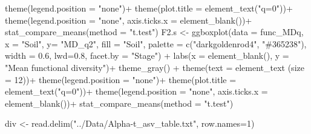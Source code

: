 \documentclass[]{interact}
\theoremstyle{plain}%
\theoremstyle{definition}
\theoremstyle{remark}
\newenvironment{Shaded}{\begin{snugshade}}{\end{snugshade}}
\newcommand{\AttributeTok}[1]{\textcolor[rgb]{0.77,0.63,0.00}{#1}}
\newcommand{\DecValTok}[1]{\textcolor[rgb]{0.00,0.00,0.81}{#1}}
\newcommand{\FloatTok}[1]{\textcolor[rgb]{0.00,0.00,0.81}{#1}}
\newcommand{\FunctionTok}[1]{\textcolor[rgb]{0.00,0.00,0.00}{#1}}
\newcommand{\NormalTok}[1]{#1}
\newcommand{\OtherTok}[1]{\textcolor[rgb]{0.56,0.35,0.01}{#1}}
\newcommand{\SpecialCharTok}[1]{\textcolor[rgb]{0.00,0.00,0.00}{#1}}
\newcommand{\StringTok}[1]{\textcolor[rgb]{0.31,0.60,0.02}{#1}}
\begin{document}
\begin{Shaded}
\begin{Highlighting}[]
  \FunctionTok{theme}\NormalTok{(}\AttributeTok{legend.position =} \StringTok{"none"}\NormalTok{)}\SpecialCharTok{+}
  \FunctionTok{theme}\NormalTok{(}\AttributeTok{plot.title =} \FunctionTok{element\_text}\NormalTok{(}\StringTok{"q=0"}\NormalTok{))}\SpecialCharTok{+}
  \FunctionTok{theme}\NormalTok{(}\AttributeTok{legend.position =} \StringTok{"none"}\NormalTok{,}
        \AttributeTok{axis.ticks.x =} \FunctionTok{element\_blank}\NormalTok{())}\SpecialCharTok{+}
  \FunctionTok{stat\_compare\_means}\NormalTok{(}\AttributeTok{method =} \StringTok{"t.test"}\NormalTok{)}
\NormalTok{F2.s }\OtherTok{\textless{}{-}} \FunctionTok{ggboxplot}\NormalTok{(}\AttributeTok{data =}\NormalTok{ func\_MDq, }\AttributeTok{x =} \StringTok{"Soil"}\NormalTok{, }\AttributeTok{y=} \StringTok{"MD\_q2"}\NormalTok{,}
                  \AttributeTok{fill =} \StringTok{"Soil"}\NormalTok{, }\AttributeTok{palette =} \FunctionTok{c}\NormalTok{(}\StringTok{"darkgoldenrod4"}\NormalTok{, }\StringTok{"\#365238"}\NormalTok{), }
                  \AttributeTok{width =} \FloatTok{0.6}\NormalTok{, }\AttributeTok{lwd=}\FloatTok{0.8}\NormalTok{, }\AttributeTok{facet.by =} \StringTok{"Stage"}\NormalTok{)  }\SpecialCharTok{+}
  \FunctionTok{labs}\NormalTok{(}\AttributeTok{x =} \FunctionTok{element\_blank}\NormalTok{(), }\AttributeTok{y =} \StringTok{"Mean functional diversity"}\NormalTok{)}\SpecialCharTok{+}
  \FunctionTok{theme\_gray}\NormalTok{() }\SpecialCharTok{+}
  \FunctionTok{theme}\NormalTok{(}\AttributeTok{text =} \FunctionTok{element\_text}\NormalTok{ (}\AttributeTok{size =} \DecValTok{12}\NormalTok{))}\SpecialCharTok{+}
  \FunctionTok{theme}\NormalTok{(}\AttributeTok{legend.position =} \StringTok{"none"}\NormalTok{)}\SpecialCharTok{+}
  \FunctionTok{theme}\NormalTok{(}\AttributeTok{plot.title =} \FunctionTok{element\_text}\NormalTok{(}\StringTok{"q=0"}\NormalTok{))}\SpecialCharTok{+}
  \FunctionTok{theme}\NormalTok{(}\AttributeTok{legend.position =} \StringTok{"none"}\NormalTok{,}
        \AttributeTok{axis.ticks.x =} \FunctionTok{element\_blank}\NormalTok{())}\SpecialCharTok{+}
  \FunctionTok{stat\_compare\_means}\NormalTok{(}\AttributeTok{method =} \StringTok{"t.test"}\NormalTok{)}

\NormalTok{div }\OtherTok{\textless{}{-}} \FunctionTok{read.delim}\NormalTok{(}\StringTok{"../Data/Alpha{-}t\_asv\_table.txt"}\NormalTok{, }\AttributeTok{row.names=}\DecValTok{1}\NormalTok{)}


\end{Highlighting}
\end{Shaded}
\end{document}
